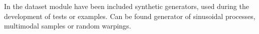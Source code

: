 In the dataset module have been included synthetic generators, used during the
development of tests or examples. Can be found generator of sinusoidal
processes, multimodal samples or random warpings.
